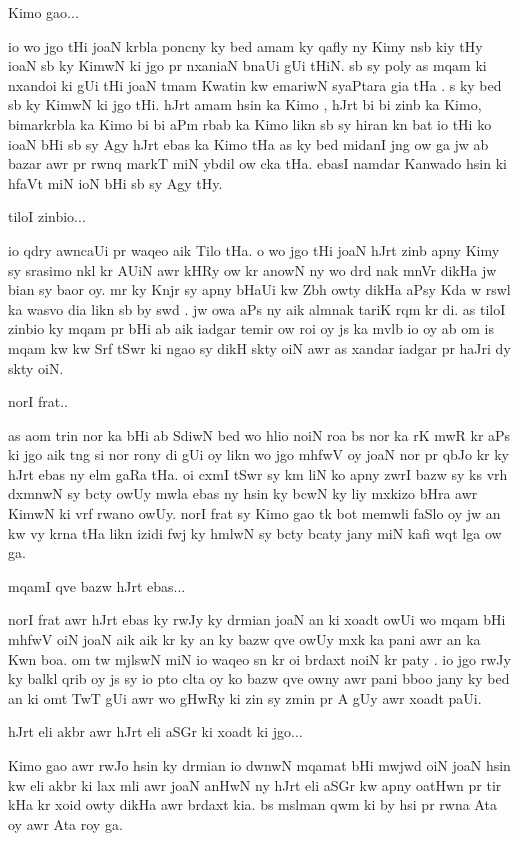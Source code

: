 \documentclass[a4paper]{article}
\begin{document}
Kimo gao...

io wo jgo tHi joaN krbla poncny ky bed amam ky qafly ny Kimy nsb kiy tHy ioaN sb ky KimwN ki jgo pr nxaniaN bnaUi gUi tHiN.
sb sy poly as mqam ki nxandoi ki gUi tHi joaN tmam Kwatin kw emariwN syaPtara  gia tHa .
s ky bed sb ky KimwN ki jgo tHi.
hJrt amam hsin ka Kimo , hJrt bi bi zinb ka Kimo, bimarkrbla ka Kimo bi bi aPm rbab  ka Kimo likn sb sy hiran kn bat io tHi ko ioaN bHi  sb sy Agy hJrt ebas ka Kimo tHa as ky bed midanI jng ow ga jw ab bazar awr pr rwnq markT miN ybdil ow cka tHa.
ebasI namdar Kanwado hsin ki hfaVt miN ioN bHi sb sy Agy tHy.

tiloI zinbio...

io qdry awncaUi pr waqeo aik Tilo tHa.
o wo jgo tHi joaN hJrt zinb apny Kimy sy srasimo nkl kr AUiN awr kHRy ow kr anowN ny  wo drd nak mnVr dikHa jw bian sy baor oy.
mr ky Knjr sy apny bHaUi kw Zbh owty dikHa aPsy Kda w rswl ka wasvo dia likn sb by swd  .
jw owa aPs ny aik almnak tariK rqm kr di.
as tiloI zinbio ky mqam pr bHi ab aik iadgar temir ow roi oy js ka mvlb io oy ab om is mqam kw kw Srf tSwr ki ngao sy dikH skty oiN awr as xandar iadgar pr haJri dy skty oiN.

norI frat..

as aom trin nor ka bHi ab SdiwN bed wo hlio noiN roa  bs nor ka rK mwR kr aPs ki jgo aik tng si nor rony di gUi oy likn wo jgo mhfwV oy joaN nor pr qbJo kr ky hJrt ebas ny elm gaRa tHa.
oi cxmI tSwr  sy km liN ko apny zwrI bazw sy ks vrh dxmnwN sy bcty owUy mwla ebas ny hsin ky bcwN ky liy mxkizo bHra awr KimwN ki vrf rwano owUy.
norI frat sy Kimo gao  tk bot memwli faSlo oy jw an kw vy krna tHa likn izidi fwj ky hmlwN sy bcty bcaty jany miN kafi wqt lga ow ga.

mqamI qve bazw hJrt ebas...

norI frat awr hJrt ebas ky  rwJy ky drmian joaN an ki xoadt owUi wo  mqam bHi mhfwV oiN joaN aik aik kr ky an ky bazw qve owUy mxk ka pani awr an ka Kwn boa.
om tw mjlswN miN io waqeo sn kr oi brdaxt noiN kr paty .
io jgo rwJy ky balkl qrib oy js sy io pto clta oy ko bazw qve owny awr pani bboo jany ky  bed an ki omt TwT gUi awr wo gHwRy ki zin sy zmin pr A gUy awr xoadt  paUi.

hJrt eli akbr awr hJrt eli aSGr ki xoadt ki jgo...

Kimo gao awr rwJo hsin ky drmian io dwnwN mqamat bHi mwjwd oiN joaN hsin kw eli akbr ki lax mli awr joaN anHwN ny hJrt eli aSGr kw apny oatHwn pr tir kHa kr xoid owty dikHa awr brdaxt kia.
bs mslman qwm ki by hsi pr rwna Ata oy awr Ata roy ga.
\end{document}
